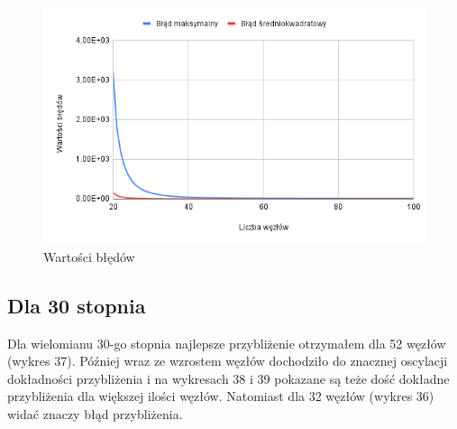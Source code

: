 \documentclass{article}
\begin{document}
\begin{figure}[H]
  \centering
  \begin{minipage}[b]{0.4\textwidth}
    \includegraphics[width=\textwidth]{img37.png}
    \caption{Wartości błędów}
  \end{minipage}
\end{figure}

\newpage

\subsection{Dla 30 stopnia}

Dla wielomianu 30-go stopnia najlepsze przybliżenie otrzymałem dla 52 węzłów (wykres 37). Później wraz ze wzrostem węzłów dochodziło do znacznej oscylacji dokładności przybliżenia i na wykresach 38 i 39 pokazane są teże dość dokładne przybliżenia dla większej ilości węzłów. Natomiast dla 32 węzłów (wykres 36) widać znaczy błąd przybliżenia.
\end{document}
